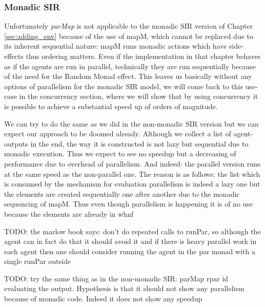 \subsubsection{Monadic SIR}
Unfortunately \textit{parMap} is not applicable to the monadic SIR version of Chapter \ref{sec:adding_env} because of the use of mapM, which cannot be replaced due to its inherent sequential nature: mapM runs monadic actions which have side-effects thus ordering matters. Even if the implementation in that chapter behaves as if the agents are run in parallel, technically they are run sequentially because of the need for the Random Monad effect. This leaves us basically without any options of parallelism for the monadic SIR model, we will come back to this use-case in the concurrency section, where we will show that by using concurrency it is possible to achieve a substantial speed up of orders of magnitude.

We can try to do the same as we did in the non-monadic SIR version but we can expect our approach to be doomed already. Although we collect a list of agent-outputs in the end, the way it is constructed is not lazy but sequential due to monadic execution. Thus we expect to see no speedup but a decreasing of performance due to overhead of parallelism. And indeed: the parallel version runs at the same speed as the non-parallel one. The reason is as follows: the list which is consumed by the mechanism for evaluation parallelism is indeed a lazy one but the elements are created sequentially one after another due to the monadic sequencing of mapM. 
Thus even though parallelism is happening it is of no use because the elements are already in whnf

TODO: the marlow book says: don't do repeated calls to runPar, so although the agent can in fact do that it should avoid it and if there is heavy parallel work in each agent then one should consider running the agent in the par monad with a single runPar outside



TODO: try the same thing as in the non-monadic SIR: parMap rpar id evaluating the output. Hypothesis is that it should not show any parallelism because of monadic code. Indeed it does not show any speedup
